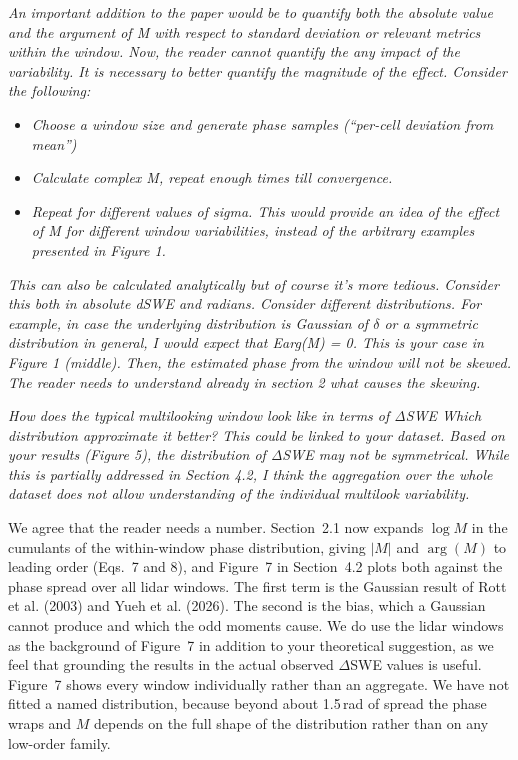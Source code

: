 \documentclass[tc, manuscript]{copernicus}
\begin{document}
\textit{An important addition to the paper would be to quantify both the absolute value and the argument of M with respect to standard deviation or relevant metrics within the window. Now, the reader cannot quantify the any impact of the variability. It is necessary to better quantify the magnitude of the effect. Consider the following:}
\begin{itemize}
    \item \textit{Choose a window size and generate phase samples (“per-cell deviation from mean”)}
    \item \textit{Calculate complex M, repeat enough times till convergence.}
    \item \textit{Repeat for different values of sigma. This would provide an idea of the effect of M for different window variabilities, instead of the arbitrary examples presented in Figure 1.}
\end{itemize}
\textit{This can also be calculated analytically but of course it's more tedious. Consider this both in absolute dSWE and radians. Consider different distributions. For example, in case the underlying distribution is Gaussian of $\delta$ or a symmetric distribution in general, I would expect that E{arg(M)} = 0. This is your case in Figure 1 (middle). Then, the estimated phase from the window will not be skewed. The reader needs to understand already in section 2 what causes the skewing.}

\textit{How does the typical multilooking window look like in terms of ΔSWE Which distribution approximate it better? This could be linked to your dataset. Based on your results (Figure 5), the distribution of ΔSWE may not be symmetrical. While this is partially addressed in Section 4.2, I think the aggregation over the whole dataset does not allow understanding of the individual multilook variability.}

We agree that the reader needs a number. Section~2.1 now expands $\log M$ in the cumulants of the within-window phase distribution, giving $|M|$ and $\arg(M)$ to leading order (Eqs.~7 and 8), and Figure~7 in Section~4.2 plots both against the phase spread over all lidar windows. The first term is the Gaussian result of Rott et al. (2003) and Yueh et al. (2026). The second is the bias, which a Gaussian cannot produce and which the odd moments cause. We do use the lidar windows as the background of Figure~7 in addition to your theoretical suggestion, as we feel that grounding the results in the actual observed $\Delta$SWE values is useful. Figure~7 shows every window individually rather than an aggregate. We have not fitted a named distribution, because beyond about 1.5\,rad of spread the phase wraps and $M$ depends on the full shape of the distribution rather than on any low-order family.
\end{document}
